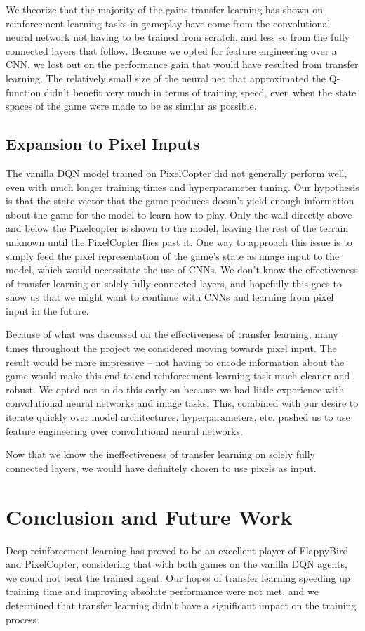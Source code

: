 \documentclass{article}
\begin{document}
We theorize that the majority of the gains transfer learning has shown on reinforcement learning tasks in gameplay have come from the convolutional neural network not having to be trained from scratch, and less so from the fully connected layers that follow.
Because we opted for feature engineering over a CNN, we lost out on the performance gain that would have resulted from transfer learning.
The relatively small size of the neural net that approximated the Q-function didn't benefit very much in terms of training speed, even when the state spaces of the game were made to be as similar as possible.

\subsection{Expansion to Pixel Inputs}
The vanilla DQN model trained on PixelCopter did not generally perform well, even with much longer training times and hyperparameter tuning. Our hypothesis is that the state vector that the game produces doesn't yield enough information about the game for the model to learn how to play. Only the wall directly above and below the Pixelcopter is shown to the model, leaving the rest of the terrain unknown until the PixelCopter flies past it. One way to approach this issue is to simply feed the pixel representation of the game's state as image input to the model, which would necessitate the use of CNNs. We don't know the effectiveness of transfer learning on solely fully-connected layers, and hopefully this goes to show us that we might want to continue with CNNs and learning from pixel input in the future.

Because of what was discussed on the effectiveness of transfer learning, many times throughout the project we considered moving towards pixel input. 
The result would be more impressive -- not having to encode information about the game would make this end-to-end reinforcement learning task much cleaner and robust.
We opted not to do this early on because we had little experience with convolutional neural networks and image tasks.
This, combined with our desire to iterate quickly over model architectures, hyperparameters, etc. pushed us to use feature engineering over convolutional neural networks. 

Now that we know the ineffectiveness of transfer learning on solely fully connected layers, we would have definitely chosen to use pixels as input.

\section{Conclusion and Future Work}
Deep reinforcement learning has proved to be an excellent player of FlappyBird and PixelCopter, considering that with both games on the vanilla DQN agents, we could not beat the trained agent.
Our hopes of transfer learning speeding up training time and improving absolute performance were not met, and we determined that transfer learning didn't have a significant impact on the training process.
\end{document}
